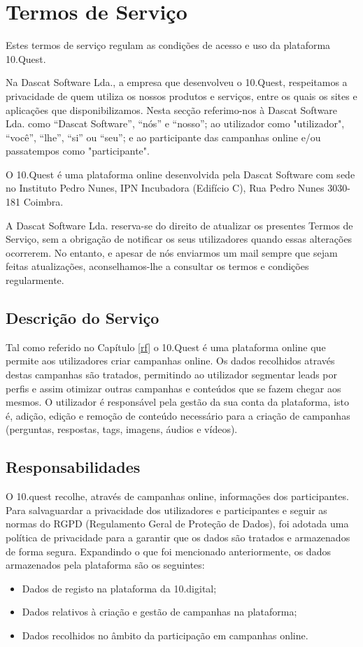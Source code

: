 \chapter{Termos de Serviço}
\label{sec:gdpr}

Estes termos de serviço regulam as condições de acesso e uso da plataforma 10.Quest. 

Na Dascat Software Lda., a empresa que desenvolveu o 10.Quest, respeitamos a privacidade de quem utiliza os nossos produtos e serviços, entre os quais os sites e aplicações que disponibilizamos. Nesta secção referimo-nos à Dascat Software Lda. como “Dascat Software”, “nós” e “nosso”; ao utilizador como "utilizador", “você”, “lhe”, “si” ou “seu”; e ao participante das campanhas online e/ou passatempos como "participante".

O 10.Quest é uma plataforma online desenvolvida pela Dascat Software com sede no Instituto Pedro Nunes, IPN Incubadora (Edifício C), Rua Pedro Nunes 3030-181 Coimbra.

A Dascat Software Lda. reserva-se do direito de atualizar os presentes Termos de Serviço, sem a obrigação de notificar os seus utilizadores quando essas alterações ocorrerem. No entanto, e apesar de nós enviarmos um mail sempre que sejam feitas atualizações, aconselhamos-lhe a consultar os termos e condições regularmente.

\section{Descrição do Serviço}

Tal como referido no Capítulo \ref{rf} o 10.Quest é uma plataforma online que permite aos utilizadores criar campanhas online. Os dados recolhidos através destas campanhas são tratados, permitindo ao utilizador segmentar leads por perfis e assim otimizar outras campanhas e conteúdos que se fazem chegar aos mesmos.
O utilizador é responsável pela gestão da sua conta da plataforma, isto é, adição, edição e remoção de conteúdo necessário para a criação de campanhas (perguntas, respostas, tags, imagens, áudios e vídeos).

\section{Responsabilidades}

O 10.quest recolhe, através de campanhas online, informações dos participantes. Para salvaguardar a privacidade dos utilizadores e participantes e seguir as normas do RGPD (Regulamento Geral de Proteção de Dados)\cite{f10}, foi adotada uma política de privacidade para a garantir que os dados são tratados e armazenados de forma segura.
Expandindo o que foi mencionado anteriormente, os dados armazenados pela plataforma são os seguintes:
\begin{itemize}
	\item Dados de registo na plataforma da 10.digital;
	\item Dados relativos à criação e gestão de campanhas na plataforma;
	\item Dados recolhidos no âmbito da participação em campanhas online.
\end{itemize}

